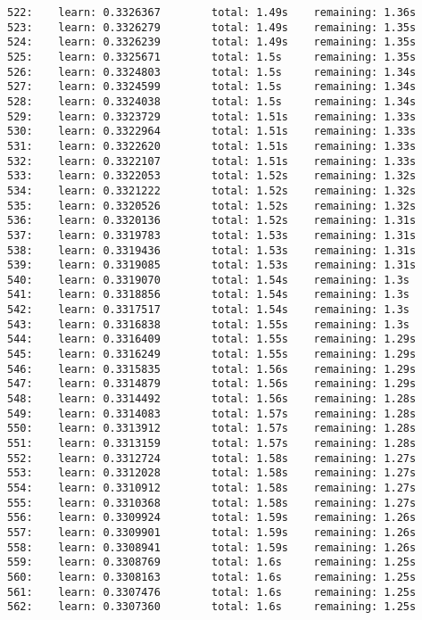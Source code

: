 \documentclass[11pt]{article}
\begin{document}
\begin{Verbatim}[commandchars=\\\{\}]
522:    learn: 0.3326367        total: 1.49s    remaining: 1.36s
523:    learn: 0.3326279        total: 1.49s    remaining: 1.35s
524:    learn: 0.3326239        total: 1.49s    remaining: 1.35s
525:    learn: 0.3325671        total: 1.5s     remaining: 1.35s
526:    learn: 0.3324803        total: 1.5s     remaining: 1.34s
527:    learn: 0.3324599        total: 1.5s     remaining: 1.34s
528:    learn: 0.3324038        total: 1.5s     remaining: 1.34s
529:    learn: 0.3323729        total: 1.51s    remaining: 1.33s
530:    learn: 0.3322964        total: 1.51s    remaining: 1.33s
531:    learn: 0.3322620        total: 1.51s    remaining: 1.33s
532:    learn: 0.3322107        total: 1.51s    remaining: 1.33s
533:    learn: 0.3322053        total: 1.52s    remaining: 1.32s
534:    learn: 0.3321222        total: 1.52s    remaining: 1.32s
535:    learn: 0.3320526        total: 1.52s    remaining: 1.32s
536:    learn: 0.3320136        total: 1.52s    remaining: 1.31s
537:    learn: 0.3319783        total: 1.53s    remaining: 1.31s
538:    learn: 0.3319436        total: 1.53s    remaining: 1.31s
539:    learn: 0.3319085        total: 1.53s    remaining: 1.31s
540:    learn: 0.3319070        total: 1.54s    remaining: 1.3s
541:    learn: 0.3318856        total: 1.54s    remaining: 1.3s
542:    learn: 0.3317517        total: 1.54s    remaining: 1.3s
543:    learn: 0.3316838        total: 1.55s    remaining: 1.3s
544:    learn: 0.3316409        total: 1.55s    remaining: 1.29s
545:    learn: 0.3316249        total: 1.55s    remaining: 1.29s
546:    learn: 0.3315835        total: 1.56s    remaining: 1.29s
547:    learn: 0.3314879        total: 1.56s    remaining: 1.29s
548:    learn: 0.3314492        total: 1.56s    remaining: 1.28s
549:    learn: 0.3314083        total: 1.57s    remaining: 1.28s
550:    learn: 0.3313912        total: 1.57s    remaining: 1.28s
551:    learn: 0.3313159        total: 1.57s    remaining: 1.28s
552:    learn: 0.3312724        total: 1.58s    remaining: 1.27s
553:    learn: 0.3312028        total: 1.58s    remaining: 1.27s
554:    learn: 0.3310912        total: 1.58s    remaining: 1.27s
555:    learn: 0.3310368        total: 1.58s    remaining: 1.27s
556:    learn: 0.3309924        total: 1.59s    remaining: 1.26s
557:    learn: 0.3309901        total: 1.59s    remaining: 1.26s
558:    learn: 0.3308941        total: 1.59s    remaining: 1.26s
559:    learn: 0.3308769        total: 1.6s     remaining: 1.25s
560:    learn: 0.3308163        total: 1.6s     remaining: 1.25s
561:    learn: 0.3307476        total: 1.6s     remaining: 1.25s
562:    learn: 0.3307360        total: 1.6s     remaining: 1.25s

\end{Verbatim}
\end{document}
